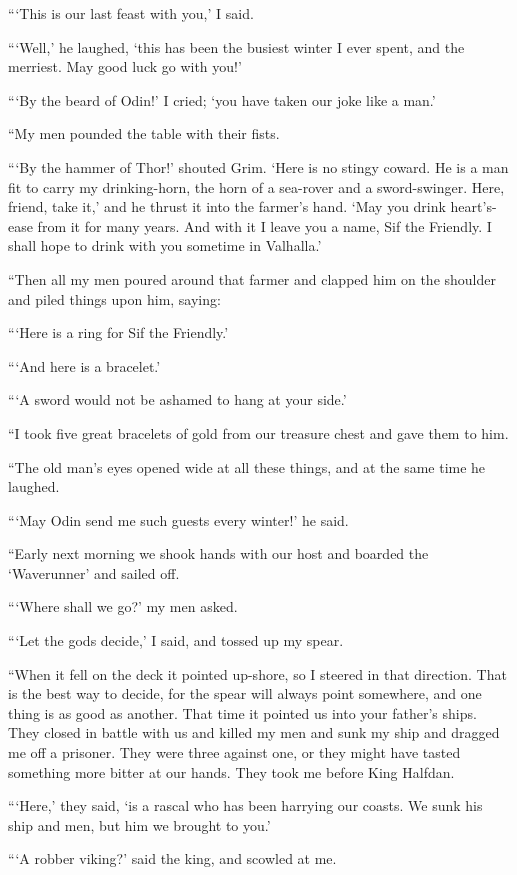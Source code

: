 ```This is our last feast with you,' I said.

```Well,' he laughed, `this has been the busiest winter I ever spent, and
the merriest. May good luck go with you!'

```By the beard of Odin!' I cried; `you have taken our joke like a man.'

``My men pounded the table with their fists.

```By the hammer of Thor!' shouted Grim. `Here is no stingy coward. He is
a man fit to carry my drinking-horn, the horn of a sea-rover and a
sword-swinger. Here, friend, take it,' and he thrust it into the
farmer's hand. `May you drink heart's-ease from it for many years. And
with it I leave you a name, Sif the Friendly. I shall hope to drink with
you sometime in Valhalla.'

``Then all my men poured around that farmer and clapped him on the
shoulder and piled things upon him, saying:

```Here is a ring for Sif the Friendly.'

```And here is a bracelet.'

```A sword would not be ashamed to hang at your side.'

``I took five great bracelets of gold from our treasure chest and gave
them to him.

``The old man's eyes opened wide at all these things, and at the same
time he laughed.

```May Odin send me such guests every winter!' he said.

``Early next morning we shook hands with our host and boarded the
`Waverunner' and sailed off.

```Where shall we go?' my men asked.

```Let the gods decide,' I said, and tossed up my spear.

``When it fell on the deck it pointed up-shore, so I steered in that
direction. That is the best way to decide, for the spear will always
point somewhere, and one thing is as good as another. That time it
pointed us into your father's ships. They closed in battle with us and
killed my men and sunk my ship and dragged me off a prisoner. They were
three against one, or they might have tasted something more bitter at
our hands. They took me before King Halfdan.

```Here,' they said, `is a rascal who has been harrying our coasts. We
sunk his ship and men, but him we brought to you.'

```A robber viking?' said the king, and scowled at me.

